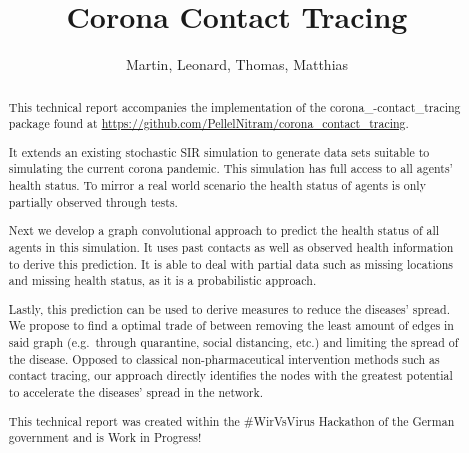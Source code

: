 \documentclass[]{article}
\title{Corona Contact Tracing}
\author{Martin, Leonard, Thomas, Matthias}
\begin{document}
\maketitle

\begin{abstract}
	This technical report accompanies the implementation of the corona\_-contact\_tracing package found at \url{https://github.com/PellelNitram/corona_contact_tracing}.

	It extends an existing stochastic SIR simulation to generate data sets suitable to simulating the current corona pandemic.
	This simulation has full access to all agents' health status.
	To mirror a real world scenario the health status of agents is only partially observed through tests.

	Next we develop a graph convolutional approach to predict the health status of all agents in this simulation.
	It uses past contacts as well as observed health information to derive this prediction.
	It is able to deal with partial data such as missing locations and missing health status, as it is a probabilistic approach.
	
	Lastly, this prediction can be used to derive measures to reduce the diseases' spread.
	We propose to find a optimal trade of between removing the least amount of edges in said graph (e.g.\ through quarantine, social distancing, etc.) and limiting the spread of the disease.
	Opposed to classical non-pharmaceutical intervention methods such as contact tracing, our approach directly identifies the nodes with the greatest potential to accelerate the diseases' spread in the network.
	
	This technical report was created within the \#WirVsVirus Hackathon of the German government and is Work in Progress!
\end{abstract}











\printbibliography{}
\end{document}
